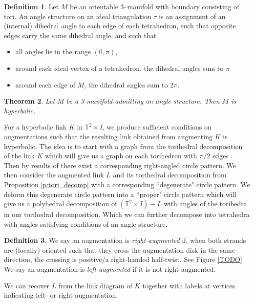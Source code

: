 \documentclass[11pt]{amsart}
\newcommand{\torus}{{\mathbb{T}^2}}
\theoremstyle{plain}
\newtheorem{theorem}{Theorem}[section]
\theoremstyle{definition}
\newtheorem{define}[theorem]{Definition}
\begin{document}
\begin{define}
Let $M$ be an orientable 3–manifold with boundary consisting of tori. An angle structure on an ideal triangulation $\tau$ is an assignment of an (internal) dihedral angle to each edge of each tetrahedron, such that opposite
edges carry the same dihedral angle, and such that
\begin{itemize}
\item all angles lie in the range $(0,\pi)$,
\item around each ideal vertex of a tetrahedron, the dihedral angles sum to $\pi$
\item around each edge of $M$, the dihedral angles sum to $2\pi$.
\end{itemize}
\end{define}

\begin{theorem}\cite{Casson-Rivin}\label{thm:Casson-Rivin}
Let $M$ be a 3-manifold admitting an angle structure. Then $M$ is hyperbolic.
\end{theorem}

For a hyperbolic link $K$ in $\torus \times I$, we produce sufficient conditions
on augmentations such that the resulting link obtained from augmenting $K$ is
hyperbolic. The idea is to start with a graph from the torihedral decomposition
of the link $K$ which will give us a graph on each torihedron with $\pi/2$ edges
\cite{CKP2}. Then by results of \cite{BandS} there exist a corresponding
right-angled circle pattern. We then consider the augmented link $L$ and its
torihedral decomposition from Proposition \ref{p:tori_decomp} with a
corresponding ``degenerate" circle pattern. We deform this degenerate circle
pattern into a ``proper" circle pattern which will give us a polyhedral
decomposition of $(\torus \times I)-L$ with angles of the torihedra in our
torihedral decomposition. Which we can further decompose into tetrahedra with
angles satisfying conditions of an angle structure. 



\begin{define}
We say an augmentation is \emph{right-augmented} if, when both strands are
(locally) oriented such that they cross the augmentation disk in the same
direction, the crossing is positive/a right-handed half-twist. See Figure
\ref{TODO}
We say an augmentation is \emph{left-augmented} if it is not right-augmented.
\end{define}

We can recover $L$ from the link diagram of $K$
together with labels at vertices indicating left- or right-augmentation.
\end{document}
